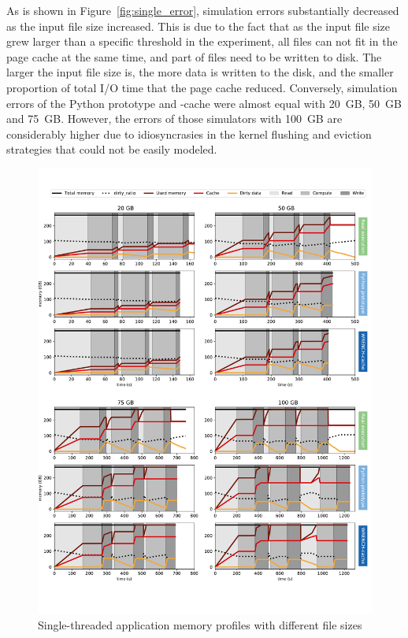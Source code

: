 As is shown in Figure~\ref{fig:single_error}, \wrench simulation errors 
substantially decreased as the input file size increased. 
This is due to the fact that as the input file size grew larger than a specific 
threshold in the experiment, all files can not fit in the page cache at the same time, 
and part of files need to be written to disk. 
The larger the input file size is, the more data is written to the disk, 
and the smaller proportion of total I/O time that the page cache reduced. 
Conversely, simulation errors of the Python prototype and \wrench-cache 
were almost equal with 20~GB, 50~GB and 75~GB. 
However, the errors of those simulators with 100~GB are considerably higher 
due to idiosyncrasies in the kernel flushing and eviction strategies that could 
not be easily modeled.

\begin{figure}[!h]
   \centering
      \includegraphics[width=\linewidth]{figures/single_memprof_full.pdf}
      \caption{Single-threaded application memory profiles with different file sizes}
      \label{fig:single_memprof}
\end{figure}

